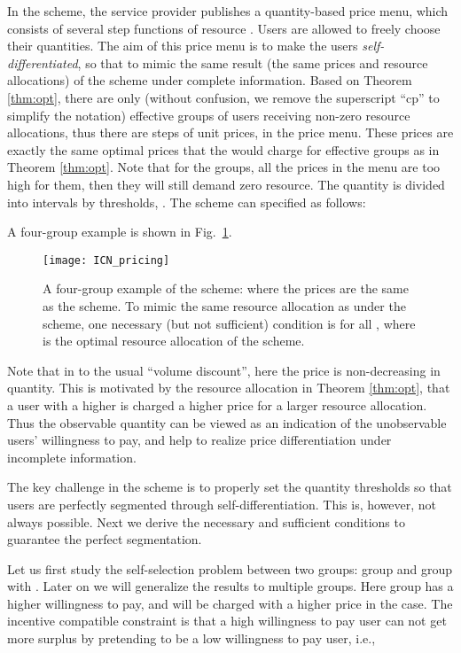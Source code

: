 \documentclass[twocolumn,10pt,twosided]{IEEEtran}
\begin{document}
In the  scheme, the service provider publishes a quantity-based price menu, which consists of several step functions of resource . Users are allowed to freely choose their quantities. The aim of this price menu is to make the users \emph{self-differentiated}, so that to mimic the same result (the same prices and resource allocations) of the  scheme under complete information.
Based on Theorem \ref{thm:opt}, there are only  (without confusion, we remove the superscript ``cp'' to simplify the notation) effective groups of users receiving non-zero resource allocations, thus there are  steps of unit prices,  in the price menu. These prices are exactly the same optimal prices that the  would charge for  effective groups as in Theorem \ref{thm:opt}. Note that for the  groups, all the prices in the menu are too high for them, then they will still demand zero resource.
The quantity is divided into  intervals by  thresholds, . The  scheme can specified as
follows:


A four-group example is shown in Fig.~\ref{fig:IC_pricing}.
\begin{figure}[ht]
\centering
\texttt{[image: ICN\_pricing]}
\caption{A four-group example of the  scheme: where the prices
 are the same as the  scheme. To mimic the same resource
allocation as under the  scheme, one necessary  (but not sufficient) condition is  for all , where  is
the optimal resource allocation of the  scheme.}
\label{fig:IC_pricing}
\end{figure}

Note that in  to the usual ``volume discount'', here the price is non-decreasing in quantity. This is motivated by the resource allocation in Theorem \ref{thm:opt}, that a user with a higher  is charged a higher price for a larger resource allocation. Thus the observable quantity can be viewed as an indication of the unobservable users' willingness to pay, and help to realize price differentiation under incomplete information.


The key challenge in the  scheme is to properly set the quantity thresholds so
that users are perfectly segmented through self-differentiation.
This is, however, not always possible. Next we derive the necessary
and sufficient conditions to guarantee the perfect segmentation.

Let us first study the self-selection problem between two groups:
group  and group  with . Later on we will generalize the
results to multiple groups. Here group  has a higher willingness to pay, and will be charged with a higher price  in the  case.   The incentive compatible constraint is that a high willingness to pay user can not get more surplus by pretending to be a low willingness to pay user, i.e.,
\end{document}
